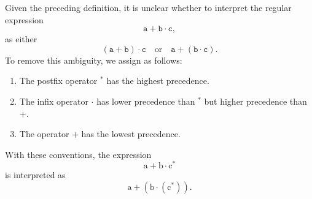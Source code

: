 Given the preceding definition, it is unclear whether to interpret the regular expression
\[
\mathtt{a} + \mathtt{b} \cdot \mathtt{c},
\]
as either
\[
(\mathtt{a} + \mathtt{b}) \cdot \mathtt{c} \quad \text{or} \quad \mathtt{a} + (\mathtt{b} \cdot \mathtt{c}).
\]
To remove this ambiguity, we assign  as follows:
\begin{enumerate}
\item The postfix operator \( ^* \) has the highest precedence.
\item The infix operator \( \cdot \) has lower precedence than \( ^* \) but higher precedence than \( + \).
\item The operator \( + \) has the lowest precedence.
\end{enumerate}
With these conventions, the expression
\[
\mathrm{a} + \mathrm{b} \cdot \mathrm{c}^*
\]
is interpreted as
\[
\mathrm{a} + \left( \mathrm{b} \cdot \left( \mathrm{c}^* \right) \right).
\]

